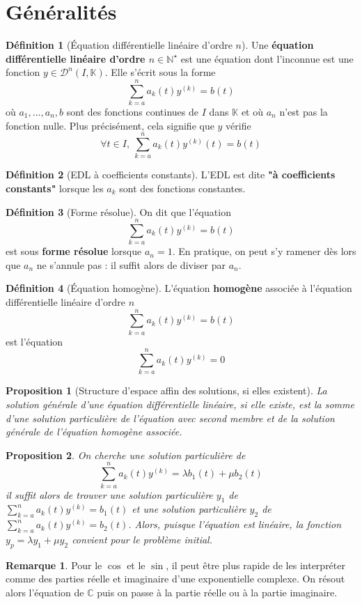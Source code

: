\documentclass[french]{book}
\newcommand{\N}{\mathbb{N}}
\newcommand{\C}{\mathbb{C}}
\newcommand{\K}{\mathbb{K}}
\newcommand{\st}{^\star}
\theoremstyle{plain}
\newtheorem{prop}{Proposition}[chapter]
\theoremstyle{definition}
\newtheorem{dfn}{Définition}[chapter]
\newtheorem{rmq}{Remarque}[chapter]
\theoremstyle{remark}
\begin{document}
\section{Généralités}
\begin{dfn}[Équation différentielle linéaire d'ordre $n$]
	Une \textbf{équation différentielle linéaire d'ordre $n\in\N\st$} est une équation dont l'inconnue est une fonction $y\in\mathcal{D}^n(I,\K)$. Elle s'écrit sous la forme $$\sum_{k=a}^{n}a_k(t)y^{(k)}=b(t)$$ où $a_1, ...,a_n,b$ sont des fonctions continues de $I$ dans $\K$ et où $a_n$ n'est pas la fonction nulle. Plus précisément, cela signifie que $y$ vérifie $$\forall t \in I, \ \sum_{k=a}^{n}a_k(t)y^{(k)}(t)=b(t)$$
\end{dfn}
\begin{dfn}[EDL à coefficients constants]
	L'EDL est dite \textbf{"à coefficients constants"} lorsque les $a_k$ sont des fonctions constantes.
\end{dfn}
\begin{dfn}[Forme résolue]
	On dit que l'équation $$\sum_{k=a}^{n}a_k(t)y^{(k)}=b(t)$$ est sous \textbf{forme résolue} lorsque $a_n=1$. En pratique, on peut s'y ramener dès lors que $a_n$ ne s'annule pas : il suffit alors de diviser par $a_n$.
\end{dfn}
\begin{dfn}[Équation homogène]
	L'équation \textbf{homogène} associée à l'équation différentielle linéaire d'ordre $n$ $$\sum_{k=a}^{n}a_k(t)y^{(k)}=b(t)$$ est l'équation $$\sum_{k=a}^{n}a_k(t)y^{(k)}=0$$
\end{dfn}
\begin{prop}[Structure d'espace affin des solutions, si elles existent]
	La solution générale d'une équation différentielle linéaire, si elle existe, est la somme d'une solution particulière de l'équation avec second membre et de la solution générale de l'équation homogène associée.
\end{prop}
\begin{prop}
	On cherche une solution particulière de $$\sum_{k=a}^{n}a_k(t)y^{(k)}=\lambda b_1(t)+\mu b_2(t)$$ il suffit alors de trouver une solution particulière $y_1$ de $\displaystyle \sum_{k=a}^{n}a_k(t)y^{(k)}=b_1(t)$ et une solution particulière $y_2$ de $\displaystyle \sum_{k=a}^{n}a_k(t)y^{(k)}=b_2(t)$. Alors, puisque l'équation est linéaire, la fonction $y_p=\lambda y_1+\mu y_2$ convient pour le problème initial.
\end{prop}
\begin{rmq} Pour le $\cos$ et le $\sin$, il peut être plus rapide de les interpréter comme des parties réelle et imaginaire d'une exponentielle complexe. On résout alors l'équation de $\C$ puis on passe à la partie réelle ou à la partie imaginaire. \end{rmq}
\end{document}
